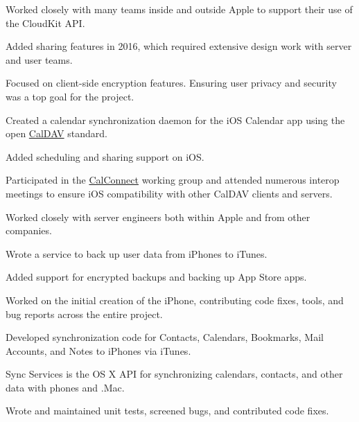 \begin{cventries}
{\begin{cvsubentries}
{\begin{cvitems}
         		\item {Worked closely with many teams inside and outside Apple to support their use of the CloudKit API.}
         		\item {Added sharing features in 2016, which required extensive design work with server and user teams.}
			\item {Focused on client-side encryption features. Ensuring user privacy and security was a top goal for the project.}
         	 \end{cvitems}
        		}
       		{%
		\vspace{-2.0mm}
		\begin{cvitems}
         		\item {Created a calendar synchronization daemon for the iOS Calendar app using the open \href{https://tools.ietf.org/html/rfc4791}{CalDAV} standard.}
			\item {Added scheduling and sharing support on iOS.} 
         		\item {Participated in the \href{https://www.calconnect.org}{CalConnect} working group and attended numerous interop meetings to ensure iOS compatibility with other CalDAV clients and servers.}
			\item {Worked closely with server engineers both within Apple and from other companies.}
         	 \end{cvitems}
        		}
       		{
		\vspace{-2.0mm}
		\begin{cvitems}
         		\item {Wrote a service to back up user data from iPhones to iTunes.}
			\item {Added support for encrypted backups and backing up App Store apps.}
         	 \end{cvitems}
        		}
       		{
		\vspace{-2.0mm}
		\begin{cvitems}
			\item {Worked on the initial creation of the iPhone, contributing code fixes, tools, and bug reports across the entire project.}
         		\item {Developed synchronization code for Contacts, Calendars, Bookmarks, Mail Accounts, and Notes to iPhones via iTunes.}
         	 \end{cvitems}
        		}
       		{Sync Services is the OS X API for synchronizing calendars, contacts, and other data with phones and .Mac.
		\vspace{2.0mm}
		\begin{cvitems}
         		\item {Wrote and maintained unit tests, screened bugs, and contributed code fixes.}
         	 \end{cvitems}
        		}
      	\end{cvsubentries}
    }
\end{cventries}